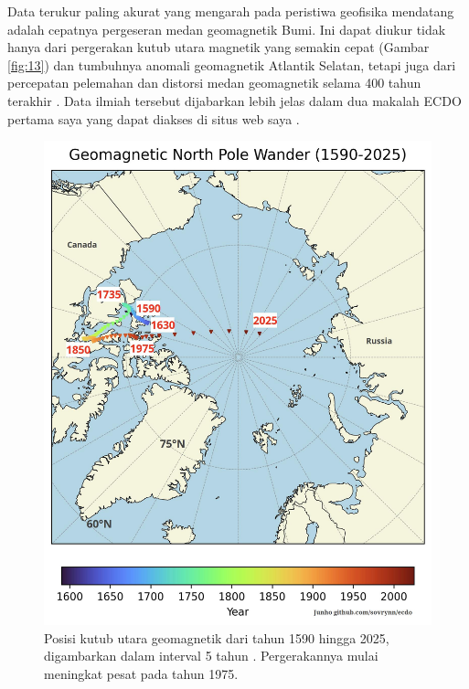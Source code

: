 \documentclass[10pt,twocolumn,letterpaper]{article}
\begin{document}
Data terukur paling akurat yang mengarah pada peristiwa geofisika mendatang adalah cepatnya pergeseran medan geomagnetik Bumi. Ini dapat diukur tidak hanya dari pergerakan kutub utara magnetik yang semakin cepat (Gambar \ref{fig:13}) dan tumbuhnya anomali geomagnetik Atlantik Selatan, tetapi juga dari percepatan pelemahan dan distorsi medan geomagnetik selama 400 tahun terakhir \cite{3}. Data ilmiah tersebut dijabarkan lebih jelas dalam dua makalah ECDO pertama saya yang dapat diakses di situs web saya \cite{3}.

\begin{figure}[t]
\begin{center}
   \includegraphics[width=1\linewidth]{npw.jpg}
\end{center}
   \caption{Posisi kutub utara geomagnetik dari tahun 1590 hingga 2025, digambarkan dalam interval 5 tahun \cite{41}. Pergerakannya mulai meningkat pesat pada tahun 1975.}
\label{fig:13}
\label{fig:onecol}
\end{figure}
\end{document}
